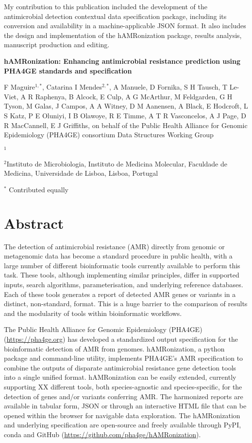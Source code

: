 My contribution to this publication included the development of the antimicrobial detection contextual data specification package, including its conversion and availability in a machine-applicable JSON format. It also includes the design and implementation of the hAMRonization package, results analysis, manuscript production and editing. 

\cleardoublepage 

\begin{center}
\large
\textbf{hAMRonization: Enhancing antimicrobial resistance  prediction using PHA4GE standards and specification}
\end{center}

F Maguire$^{1,*}$,
Catarina I Mendes$^{2,*}$, 
A Manuele, 
D Fornika, 
S H Tausch, 
T Le-Viet, 
A R Raphenya, 
B Alcock, 
E Culp, 
A G McArthur, 
M Feldgarden, 
G H Tyson, 
M Galas, 
J Campos, 
A A Witney, 
D M Aanensen, 
A Black, 
E Hodcroft, 
L S Katz, 
P E Oluniyi, 
I B Olawoye, 
R E Timme, 
A T R Vasconcelos, 
A J Page, 
D R MacCannell, 
E J Griffiths, 
on behalf of the Public Health Alliance for Genomic Epidemiology (PHA4GE) consortium Data Structures Working Group

$^1$ 

$^2$Instituto de Microbiologia, Instituto de Medicina Molecular, Faculdade de Medicina, Universidade de Lisboa, Lisboa, Portugal 

$^*$ Contributed equally 

\section{Abstract}

The detection of antimicrobial resistance (AMR) directly from genomic or metagenomic data has become a standard procedure in public health, with a large number of different bioinformatic tools currently available to perform this task. These tools, although implementing similar principles, differ in supported inputs, search algorithms, parameterisation, and underlying reference databases. Each of these tools generates a report of detected AMR genes or variants in a distinct, non-standard, format. This is a huge barrier to the comparison of results and the modularity of tools within bioinformatic workflows. 

The Public Health Alliance for Genomic Epidemiology (PHA4GE) (\url{https://pha4ge.org}) has developed a standardized output specification for the bioinformatic detection of AMR from genomes. hAMRonization, a python package and command-line utility, implements PHA4GE’s AMR specification to combine the outputs of disparate antimicrobial resistance gene detection tools into a single unified format.  hAMRonization can be easily extended, currently supporting XX different  tools, both species-agnostic and species-specific, for the detection of genes and/or variants conferring AMR. The harmonized reports are available in tabular form, JSON or through an interactive HTML file that can be opened within the browser for navigable data exploration. The hAMRonization and underlying specification are open-source and freely available through PyPI, conda and GitHub (\url{https://github.com/pha4ge/hAMRonization}).

